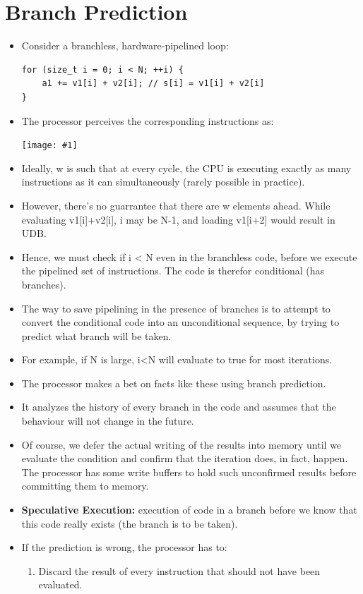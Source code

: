 \documentclass{report}
\newcommand{\mygraphic}[1]{
\begin{center}
    \texttt{[image: \#1]}
\end{center}
}
\begin{document}
\section{Branch Prediction}
\begin{itemize}
\item Consider a branchless, hardware-pipelined loop:
\begin{lstlisting}
for (size_t i = 0; i < N; ++i) {
    a1 += v1[i] + v2[i]; // s[i] = v1[i] + v2[i]
}
\end{lstlisting}
\item The processor perceives the corresponding instructions as:
\mygraphic{rsrc/wloop.png}
\item Ideally, w is such that at every cycle, the CPU is executing exactly as many instructions as it can simultaneously (rarely possible in practice).
\item However, there's no guarrantee that there are w elements ahead. While evaluating v1[i]+v2[i], i may be N-1, and loading v1[i+2] would result in UDB.
\item Hence, we must check if i < N even in the branchless code, before we execute the pipelined set of instructions. The code is therefor conditional (has branches).
\item The way to save pipelining in the presence of branches is to attempt to convert the conditional code into an unconditional sequence, by trying to predict what branch will be taken.
\item For example, if N is large, i<N will evaluate to true for most iterations.
\item The processor makes a bet on facts like these using branch prediction.
\item It analyzes the history of every branch in the code and assumes that the behaviour will not change in the future.
\item Of course, we defer the actual writing of the results into memory until we evaluate the condition and confirm that the iteration does, in fact, happen. The processor has some write buffers to hold such unconfirmed results before committing them to memory.
\item \textbf{Speculative Execution:} execution of code in a branch before we know that this code really exists (the branch is to be taken).
\item If the prediction is wrong, the processor has to:
\begin{enumerate}
    \item Discard the result of every instruction that should not have been evaluated.

\end{enumerate}
\end{itemize}
\end{document}
